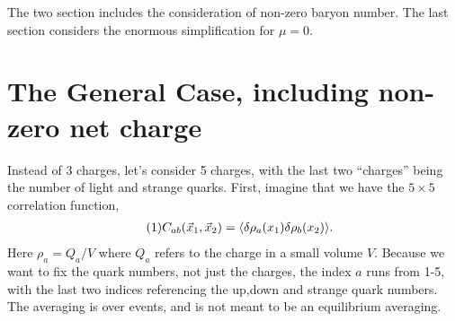 \documentclass[12pt]{article}
\numberwithin{equation}{section}
\numberwithin{figure}{section}
\newcommand\eqnumber{\addtocounter{equation}{1}\tag{\theequation}}
\begin{document}
The two section includes the consideration of non-zero baryon number. The last section considers the enormous simplification for $\mu=0$.

\section{The General Case, including non-zero net charge}

Instead of 3 charges, let's consider 5 charges, with the last two ``charges'' being the number of light and strange quarks. First, imagine that we have the $5\times 5$ correlation function,
\begin{align*}\eqnumber
C_{ab}(\vec{x}_1,\vec{x}_2)&=\langle \delta\rho_a(x_1)\delta\rho_b(x_2)\rangle.
\end{align*}
Here $\rho_a=Q_a/V$ where $Q_a$ refers to the charge in a small volume $V$. Because we want to fix the quark numbers, not just the charges, the index $a$ runs from 1-5, with the last two indices referencing the up,down and strange quark numbers. The averaging is over events, and is not meant to be an equilibrium averaging. 
\end{document}
